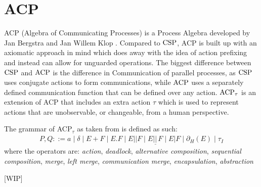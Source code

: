 \documentclass[../hons_project.tex]{subfiles}
\begin{document}
\section{ACP}
ACP (Algebra of Communicating Processes) is a Process Algebra developed by Jan Bergstra and Jan Willem Klop \citep{bergstraProcessAlgebraSynchronous1984}. Compared to $\mathrm{CSP}$, ACP is built up with an axiomatic approach in mind which does away with the idea of action prefixing and instead can allow for unguarded operations. The biggest difference between $\mathrm{CSP}$ and $\mathrm{ACP}$ is the difference in Communication of parallel processes, as $\mathrm{CSP}$ uses conjugate actions to form communications, while $\mathrm{ACP}$ uses a separately defined communication function that can be defined over any action. $\mathrm{ACP}_{\tau}$ \citep{bergstraACPtUniversalAxiom1989} is an extension of ACP that includes an extra action $\tau$ which is used to represent actions that are unobservable, or changeable, from a human perspective.

The grammar of ACP$_{\tau}$ as taken from \citep{bergstraACPtUniversalAxiom1989} is defined as such:
\begin{align*}
   P, Q ::= a \mid \delta \mid E + F \mid E . F \mid E | | F \mid E \underline{| | \,} F \mid E | F \mid \partial_{H}(E) \mid \tau_{I}
\end{align*}
where the operators are: \textit{action}, \textit{deadlock}, \textit{alternative composition}, \textit{sequential composition}, \textit{merge}, \textit{left merge}, \textit{communication merge}, \textit{encapsulation}, \textit{abstraction}


{\huge [WIP]}
\end{document}
